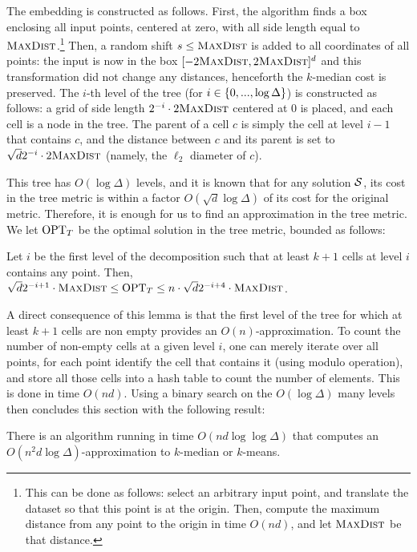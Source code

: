 The embedding is constructed as follows. First, the algorithm finds a box enclosing all input points, centered at zero, with all side length equal to $\textsc{MaxDist}$.\footnote{This can be done as follows: select an arbitrary input point, and translate the dataset so that this point is at the origin. Then, compute the maximum distance from any point to the origin in time $O(nd)$, and let $\textsc{MaxDist}$ be that distance.} Then, a random shift $s \leq \textsc{MaxDist}$ is added to all coordinates of all points: the input is now in the box $[-2\textsc{MaxDist}, 2\textsc{MaxDist}]^d$ and this transformation did not change any distances, henceforth the $k$-median cost is preserved. 
The $i$-th level of the tree (for $i \in \left\{ 0, ..., \log \Delta \right\}$) is constructed as follows: a grid of side length $2^{-i} \cdot 2\textsc{MaxDist}$ centered at $0$ is placed, and each cell is a node in the tree.
 The parent of a cell $c$ is simply the cell at level $i-1$ that contains $c$, and the distance between $c$ and its parent is set to $\sqrt{d}2^{-i} \cdot 2\textsc{MaxDist}$ (namely, the $\ell_2$ diameter of $c$).
 
 This tree has $O(\log \Delta)$ levels, and it is known that for any solution $\mathcal S$, its cost in the tree metric is within a factor $O(\sqrt d \log \Delta)$ of its cost for the original metric. Therefore, it is enough for us to find an approximation in the tree metric. We let $\text{OPT}_T$ be the optimal solution in the tree metric, bounded as follows:
 
\begin{lemma}\label{lem:apxTree}
Let $i$ be the first level of the decomposition such that at least $k+1$ cells at level $i$ contains any point. Then, $\sqrt{d}2^{-i+1} \cdot \textsc{MaxDist} \leq \text{OPT}_T \leq n \cdot \sqrt{d}2^{-i+4} \cdot \textsc{MaxDist}$.
\end{lemma}

A direct consequence of this lemma is that the first level of the tree for which at least $k+1$ cells are non empty provides an $O(n)$-approximation. 
To count the number of non-empty cells at a given level $i$, one can merely iterate over all points, for each point identify the cell that contains it (using modulo operation), and store all those cells into a hash table to count the number of elements. This is done in time $O(nd)$.
Using a binary search on the $O(\log \Delta)$ many levels then concludes this section with the following result:

\begin{lemma}\label{lem:crudeApx}
There is an algorithm running in time $O(nd \log \log \Delta)$ that computes an  $O(n^2 d \log \Delta)$-approximation to $k$-median or $k$-means.
\end{lemma}

